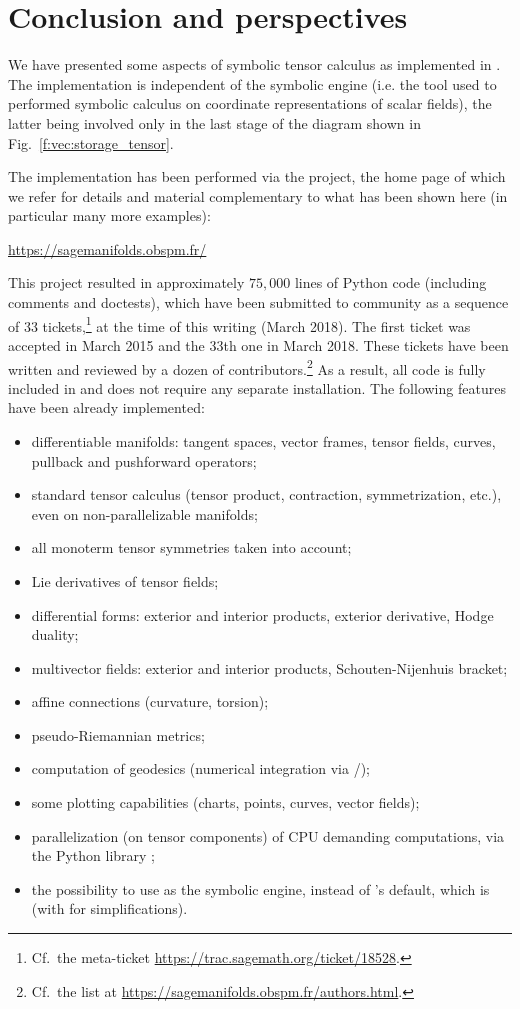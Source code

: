 \chapter{Conclusion and perspectives} \label{s:con}

We have presented some aspects of symbolic tensor calculus as implemented
in \Sage{}. The implementation is independent of the symbolic engine (i.e. the
tool used to performed symbolic calculus on coordinate representations of
scalar fields), the latter being involved only in the last stage of the diagram
shown in Fig.~\ref{f:vec:storage_tensor}.

The implementation has been performed via the 
project, the home page of which we refer for details and material complementary
to what has been shown here (in particular many more examples):
\begin{center}
\url{https://sagemanifolds.obspm.fr/}
\end{center}
This project resulted in approximately $75,000$ lines of Python code (including comments and doctests), which have been submitted to \Sage{} community as a sequence of
33 tickets,\footnote{Cf.\ the meta-ticket \url{https://trac.sagemath.org/ticket/18528}.}
at the time of this writing (March 2018). The
first ticket was accepted in March 2015 and the 33th one in March 2018.
These tickets have been written and reviewed by a dozen of
contributors.\footnote{Cf.\ the list at \url{https://sagemanifolds.obspm.fr/authors.html}.}
As a result, all code is fully included in  and does not require
any separate installation. The following features have been already implemented:
\begin{itemize}
\item differentiable manifolds: tangent spaces, vector frames, tensor fields, curves, pullback and pushforward operators;
\item standard tensor calculus (tensor product, contraction, symmetrization, etc.), even on non-parallelizable manifolds;
\item all monoterm tensor symmetries taken into account;
\item Lie derivatives of tensor fields;
\item differential forms: exterior and interior products, exterior derivative,
Hodge duality;
\item multivector fields: exterior and interior products, Schouten-Nijenhuis bracket;
\item affine connections (curvature, torsion);
\item pseudo-Riemannian metrics;
\item computation of geodesics (numerical integration via \Sage{}/);
\item some plotting capabilities (charts, points, curves, vector fields);
\item parallelization (on tensor components) of CPU demanding computations,
via the Python library ;
\item the possibility to use  as the symbolic engine, instead of
\Sage{}'s default, which is  (with  for simplifications).
\end{itemize}
